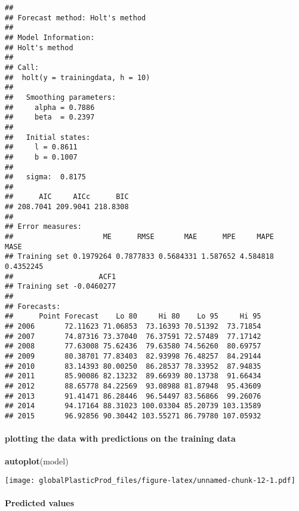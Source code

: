 \documentclass[
]{article}
\newenvironment{Shaded}{\begin{snugshade}}{\end{snugshade}}
\newcommand{\KeywordTok}[1]{\textcolor[rgb]{0.13,0.29,0.53}{\textbf{#1}}}
\newcommand{\NormalTok}[1]{#1}
\newcommand{\OperatorTok}[1]{\textcolor[rgb]{0.81,0.36,0.00}{\textbf{#1}}}
\newcommand{\StringTok}[1]{\textcolor[rgb]{0.31,0.60,0.02}{#1}}
\begin{document}
\begin{verbatim}
## 
## Forecast method: Holt's method
## 
## Model Information:
## Holt's method 
## 
## Call:
##  holt(y = trainingdata, h = 10) 
## 
##   Smoothing parameters:
##     alpha = 0.7886 
##     beta  = 0.2397 
## 
##   Initial states:
##     l = 0.8611 
##     b = 0.1007 
## 
##   sigma:  0.8175
## 
##      AIC     AICc      BIC 
## 208.7041 209.9041 218.8308 
## 
## Error measures:
##                     ME      RMSE       MAE      MPE     MAPE      MASE
## Training set 0.1979264 0.7877833 0.5684331 1.587652 4.584818 0.4352245
##                    ACF1
## Training set -0.0460277
## 
## Forecasts:
##      Point Forecast    Lo 80     Hi 80    Lo 95     Hi 95
## 2006       72.11623 71.06853  73.16393 70.51392  73.71854
## 2007       74.87316 73.37040  76.37591 72.57489  77.17142
## 2008       77.63008 75.62436  79.63580 74.56260  80.69757
## 2009       80.38701 77.83403  82.93998 76.48257  84.29144
## 2010       83.14393 80.00250  86.28537 78.33952  87.94835
## 2011       85.90086 82.13232  89.66939 80.13738  91.66434
## 2012       88.65778 84.22569  93.08988 81.87948  95.43609
## 2013       91.41471 86.28446  96.54497 83.56866  99.26076
## 2014       94.17164 88.31023 100.03304 85.20739 103.13589
## 2015       96.92856 90.30442 103.55271 86.79780 107.05932
\end{verbatim}

\hypertarget{plotting-the-data-with-predictions-on-the-training-data}{%
\paragraph{plotting the data with predictions on the training
data}\label{plotting-the-data-with-predictions-on-the-training-data}}

\begin{Shaded}
\begin{Highlighting}[]
\KeywordTok{autoplot}\NormalTok{(model)}
\end{Highlighting}
\end{Shaded}

\texttt{[image: globalPlasticProd\_files/figure-latex/unnamed-chunk-12-1.pdf]}

\hypertarget{predicted-values}{%
\paragraph{Predicted values}\label{predicted-values}}

\begin{Shaded}
\end{Shaded}
\end{document}

